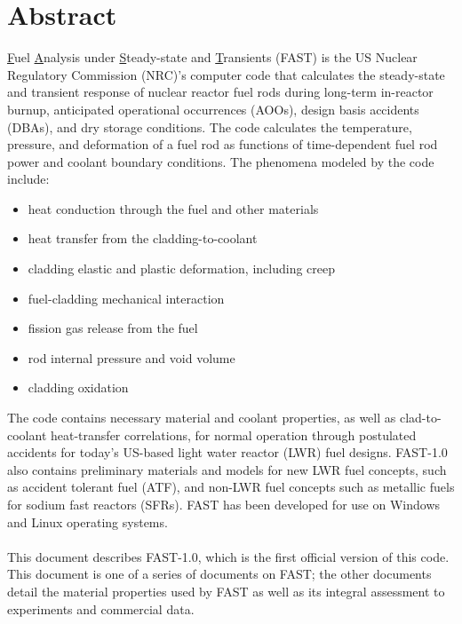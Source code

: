 \chapter*{Abstract}
\noindent
\underline{{\color{red}F}}uel \underline{{\color{red}A}}nalysis under \underline{{\color{red}S}}teady-state and
\underline{{\color{red}T}}ransients (FAST) is the US Nuclear Regulatory Commission (NRC)'s computer code
that calculates the steady-state and transient response of nuclear reactor fuel rods
during long-term in-reactor burnup, anticipated operational occurrences (AOOs), design basis
accidents (DBAs), and dry storage conditions. The code calculates the temperature, pressure, 
and deformation of a fuel rod as functions of time-dependent fuel rod power and coolant
boundary conditions. The phenomena modeled by the code include:

\begin{itemize}
    \item heat conduction through the fuel and other materials
    \item heat transfer from the cladding-to-coolant
    \item cladding elastic and plastic deformation, including creep
    \item fuel-cladding mechanical interaction
    \item fission gas release from the fuel
    \item rod internal pressure and void volume
    \item cladding oxidation
\end{itemize}

The code contains necessary material and coolant properties, as well as
clad-to-coolant heat-transfer correlations, for normal operation through postulated 
accidents for today's US-based light water reactor (LWR) fuel designs. FAST-1.0 also
contains preliminary materials and models for new LWR fuel concepts, such as accident
tolerant fuel (ATF), and non-LWR fuel concepts such as metallic fuels for sodium
fast reactors (SFRs). FAST has been developed for use on Windows and Linux 
operating systems.
\\
\\
This document describes FAST-1.0, which is the first official version of this code.
This document is one of a series of documents on FAST; the other documents detail
the material properties used by FAST as well as its integral assessment to experiments
and commercial data.
\cleardoublepage
